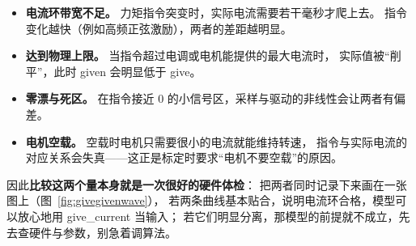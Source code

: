 \documentclass[cn,blue,11pt,device=normal]{elegantnote}
\begin{document}
\begin{itemize}
  \item \textbf{电流环带宽不足。} 力矩指令突变时，实际电流需要若干毫秒才爬上去。
  指令变化越快（例如高频正弦激励），两者的差距越明显。
  \item \textbf{达到物理上限。} 当指令超过电调或电机能提供的最大电流时，
  实际值被“削平”，此时 given 会明显低于 give。
  \item \textbf{零漂与死区。} 在指令接近 $0$ 的小信号区，采样与驱动的非线性会让两者有偏差。
  \item \textbf{电机空载。} 空载时电机只需要很小的电流就能维持转速，
  指令与实际电流的对应关系会失真——这正是标定时要求“电机不要空载”的原因。
\end{itemize}

因此\textbf{比较这两个量本身就是一次很好的硬件体检}：
把两者同时记录下来画在一张图上（图~\ref{fig:givegivenwave}），
若两条曲线基本贴合，说明电流环合格，模型可以放心地用 give\_current 当输入；
若它们明显分离，那模型的前提就不成立，先去查硬件与参数，别急着调算法。
\end{document}
